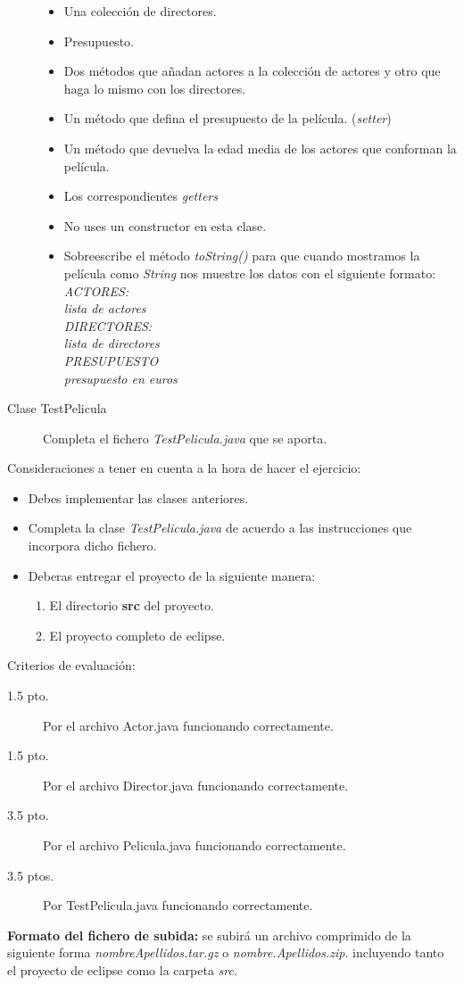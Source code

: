 \documentclass[addpoints,12pt]{exam}
\begin{document}
\begin{questions}
\begin{description}
\begin{itemize}
\item Una colección de directores.
\item Presupuesto.
\item Dos métodos que añadan actores  a la colección de actores y otro que haga lo mismo con los directores.
\item Un método que defina el presupuesto de la película. (\emph{setter})
\item Un método que devuelva la edad media de los actores que conforman la película.
\item Los correspondientes \emph{\emph{getters}}
\item No uses un constructor en esta clase.
\item Sobreescribe el método \emph{toString()} para que cuando mostramos la película como \emph{String} nos muestre los datos con el siguiente formato:\\
\newpage
\emph{ACTORES:\\
lista de actores \\
DIRECTORES:\\
lista de directores\\
PRESUPUESTO\\
presupuesto en euros}
\end{itemize}
\item[Clase TestPelicula] Completa el fichero \emph{TestPelicula.java} que se aporta.
\end{description}
Consideraciones a tener en cuenta a la hora de hacer el ejercicio:
\begin{itemize}
\item Debes implementar las clases anteriores.
\item Completa la clase \emph{TestPelicula.java} de acuerdo a las instrucciones que incorpora dicho fichero.
\item Deberas entregar el proyecto de la siguiente manera:
\begin{enumerate}
\item El directorio \textbf{src} del proyecto.
\item El proyecto completo de eclipse. 
\end{enumerate}
\end{itemize}
Criterios de evaluación:
\begin{description}
\item[1.5 pto.] Por el archivo Actor.java funcionando correctamente.
\item[1.5 pto.] Por el archivo Director.java funcionando correctamente.
\item[3.5 pto.] Por el archivo Pelicula.java funcionando correctamente.
\item[3.5 ptos.] Por TestPelicula.java funcionando correctamente.
\end{description}
\textbf{Formato del fichero de subida:} se subirá un archivo comprimido de la siguiente forma \emph{nombreApellidos.tar.gz} o \emph{nombre.Apellidos.zip}. incluyendo tanto el proyecto de eclipse como la carpeta \emph{src}.
\end{questions}
\end{document}
